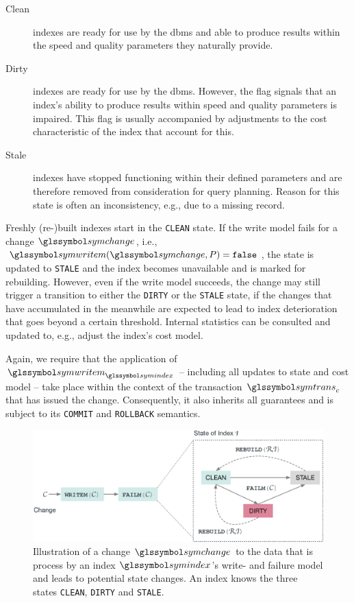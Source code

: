 \begin{description}
    \item[Clean] indexes are ready for use by the \acrshort{dbms} and able to produce results within the speed and quality parameters they naturally provide.
    \item[Dirty] indexes are ready for use by the \acrshort{dbms}. However, the flag signals that an index's ability to produce results within speed and quality parameters is impaired. This flag is usually accompanied by adjustments to the cost characteristic of the index that account for this.
    \item[Stale] indexes have stopped functioning within their defined parameters and are therefore removed from consideration for query planning. Reason for this state is often an inconsistency, e.g., due to a missing record.
\end{description}

Freshly (re-)built indexes start in the \texttt{CLEAN} state. If the write model fails for a change $\symchange$, i.e., $\symwritem(\symchange,P) = \mathtt{false}$, the state is updated to \texttt{STALE} and the index becomes unavailable and is marked for rebuilding. However, even if the write model succeeds, the change may still trigger a transition to either the \texttt{DIRTY} or the \texttt{STALE} state, if the changes that have accumulated in the meanwhile are expected to lead to index deterioration that goes beyond a certain threshold. Internal statistics can be consulted and updated to, e.g., adjust the index's cost model.

Again, we require that the application of $\symwritem_{\symindex}$ -- including all updates to state and cost model -- take place within the context of the transaction $\symtrans_c$ that has issued the change. Consequently, it also inherits all guarantees and is subject to its \texttt{COMMIT} and \texttt{ROLLBACK} semantics.

\begin{figure}[bt]
    \centering
    \includegraphics[width=\textwidth]{figures/failure_model.eps}
    \caption{Illustration of a change $\symchange$ to the data that is process by an index $\symindex$'s write- and failure model and leads to potential state changes. An index knows the three states \texttt{CLEAN}, \texttt{DIRTY} and \texttt{STALE}.}
    \label{figure:failure_model}
\end{figure}

